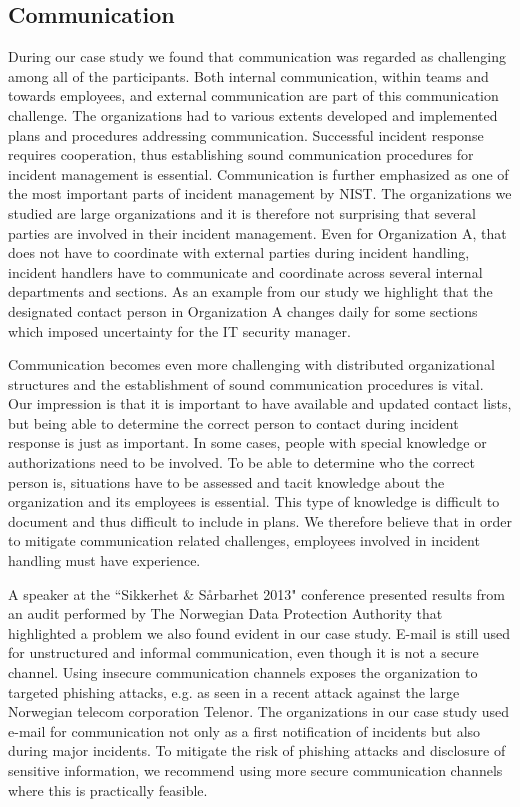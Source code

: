 \subsection{Communication}
During our case study we found that communication was regarded as challenging among all of the participants. Both internal communication, within teams and towards employees, and external communication are part of this communication challenge. The organizations had to various extents developed and implemented plans and procedures addressing communication. Successful incident response requires cooperation, thus establishing sound communication procedures for incident management is essential. Communication is further emphasized as one of the most important parts of incident management by NIST. The organizations we studied are large organizations and it is therefore not surprising that several parties are involved in their incident management. Even for Organization A, that does not have to coordinate with external parties during incident handling, incident handlers have to communicate and coordinate across several internal departments and sections. As an example from our study we highlight that the designated contact person in Organization A changes daily for some sections which imposed uncertainty for the IT security manager. 

Communication becomes even more challenging with distributed organizational structures and the establishment of sound communication procedures is vital. Our impression is that it is important to have available and updated contact lists, but being able to determine the correct person to contact during incident response is just as important. In some cases, people with special knowledge or authorizations need to be involved. To be able to determine who the correct person is, situations have to be assessed and tacit knowledge about the organization and its employees is essential. This type of knowledge is difficult to document and thus difficult to include in plans. We therefore believe that in order to mitigate communication related challenges, employees involved in incident handling must have experience. 

A speaker at the ``Sikkerhet \& S\aa rbarhet 2013" conference presented results from an audit performed by The Norwegian Data Protection Authority that highlighted a problem we also found evident in our case study. E-mail is still used for unstructured and informal communication, even though it is not a secure channel. Using insecure communication channels exposes the organization to targeted phishing attacks, e.g. as seen in a recent attack against the large Norwegian telecom corporation Telenor\cite{phisingattack}. The organizations in our case study used e-mail for communication not only as a first notification of incidents but also during major incidents. To mitigate the risk of phishing attacks and disclosure of sensitive information, we recommend using more secure communication channels where this is practically feasible. 


